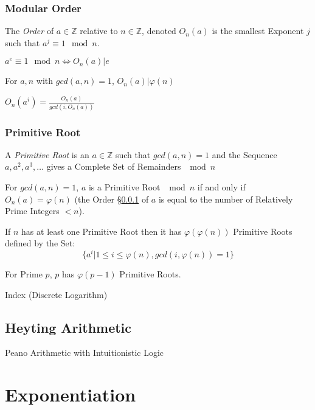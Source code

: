 \subsubsection{Modular Order}\label{sec:modular_order}

The \emph{Order} of $a \in \mathbb{Z}$ relative to $n \in \mathbb{Z}$,
denoted $O_n(a)$ is the smallest Exponent $j$ such that $a^j \equiv 1
\mod n$.

$a^e \equiv 1 \mod n \Leftrightarrow O_n(a) | e$

For $a, n$ with $gcd(a,n) = 1$, $O_n(a) | \varphi(n)$

$O_n(a^i) = \frac{O_n(a)}{gcd(i,O_n(a))}$



\subsubsection{Primitive Root}\label{sec:primitive_root}

A \emph{Primitive Root} is an $a \in \mathbb{Z}$ such that $gcd(a,n) =
1$ and the Sequence $a, a^2, a^3, \ldots$ gives a Complete Set of
Remainders $\mod n$

For $gcd(a,n) = 1$, $a$ is a Primitive Root $\mod n$ if and only if
$O_n(a) = \varphi(n)$ (the Order \S\ref{sec:modular_order} of $a$ is
equal to the number of Relatively Prime Integers $< n$).

If $n$ has at least one Primitive Root then it has
$\varphi(\varphi(n))$ Primitive Roots defined by the Set:
\[
  \{ a^i | 1 \leq i \leq \varphi(n), gcd(i,\varphi(n)) = 1 \}
\]

For Prime $p$, $p$ has $\varphi(p-1)$ Primitive Roots.

Index (Discrete Logarithm) %



\subsection{Heyting Arithmetic}\label{sec:heyting_arithmetic}

Peano Arithmetic with Intuitionistic Logic



\section{Exponentiation}\label{sec:exponentiation}

